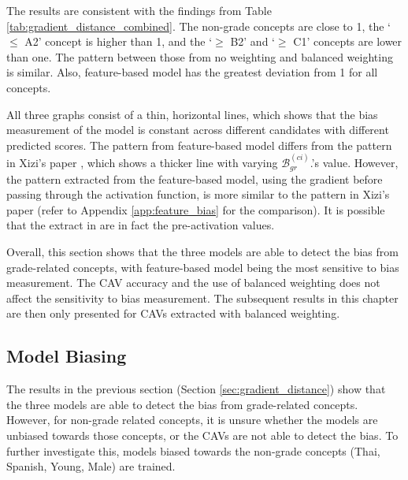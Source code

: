 The results are consistent with the findings from Table \ref{tab:gradient_distance_combined}. The non-grade concepts are close to 1, the `$\leq$ A2' concept is higher than 1, and the `$\geq$ B2' and `$\geq$ C1' concepts are lower than one. The pattern between those from no weighting and balanced weighting is similar. Also, feature-based model has the greatest deviation from 1 for all concepts.

All three graphs consist of a thin, horizontal lines, which shows that the bias measurement of the model is constant across different candidates with different predicted scores. The pattern from feature-based model differs from the pattern in Xizi's paper \cite{feature_bias}, which shows a thicker line with varying $\mathcal{B}^{(ci)}_{gr}$.'s value. However, the pattern extracted from the feature-based model, using the gradient before passing through the activation function, is more similar to the pattern in Xizi's paper (refer to Appendix \ref{app:feature_bias} for the comparison). It is possible that the extract in \cite{feature_bias} are in fact the pre-activation values.

Overall, this section shows that the three models are able to detect the bias from grade-related concepts, with feature-based model being the most sensitive to bias measurement. The CAV accuracy and the use of balanced weighting does not affect the sensitivity to bias measurement. The subsequent results in this chapter are then only presented for CAVs extracted with balanced weighting.

\subsection{Model Biasing} \label{sec:model_biasing}
The results in the previous section (Section \ref{sec:gradient_distance}) show that the three models are able to detect the bias from grade-related concepts. However, for non-grade related concepts, it is unsure whether the models are unbiased towards those concepts, or the CAVs are not able to detect the bias. To further investigate this, models biased towards the non-grade concepts (Thai, Spanish, Young, Male) are trained.

